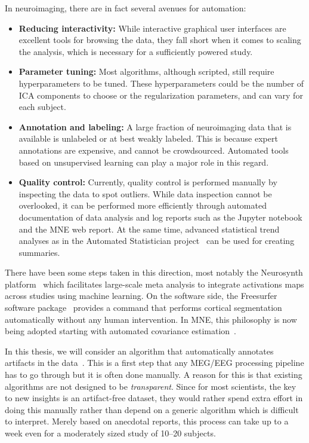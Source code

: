 In neuroimaging, there are in fact several avenues for automation:
\begin{itemize}[noitemsep,nolistsep,nosep]
\item \textbf{Reducing interactivity:} While interactive graphical user interfaces are excellent tools for browsing the data, they fall short when it comes to scaling the analysis, which is necessary for a sufficiently powered study. 

\item \textbf{Parameter tuning:} Most algorithms, although scripted, still require hyperparameters to be tuned. These hyperparameters could be the number of ICA components to choose or the regularization parameters, and can vary for each subject.
\item \textbf{Annotation and labeling:} A large fraction of neuroimaging data that is available is unlabeled or at best weakly labeled. This is because expert annotations are expensive, and cannot be crowdsourced. Automated tools based on unsupervised learning can play a major role in this regard.
\item \textbf{Quality control:} Currently, quality control is performed manually by inspecting the data to spot outliers. While data inspection cannot be overlooked, it can be performed more efficiently through automated documentation of data analysis and log reports such as the Jupyter notebook and the MNE web report. At the same time, advanced statistical trend analyses as in the Automated Statistician project~\citep{duvenaud2013structure} can be used for creating summaries.
\end{itemize}

There have been some steps taken in this direction, most notably the Neurosynth platform~\citep{yarkoni2011large} which facilitates large-scale meta analysis to integrate activations maps across studies using machine learning. On the software side, the Freesurfer software package~\citep{dale-fischl-etal:99, fischl-serena-etal:99} provides a  command that performs cortical segmentation automatically without any human intervention. In MNE, this philosophy is now being adopted starting with automated covariance estimation~\citep{engemann2015automated_new}.

In this thesis, we will consider an algorithm that automatically annotates artifacts in the data~\citep{jas2016automated, jas2017autoreject}. This is a first step that any \ac{MEG}/\ac{EEG} processing pipeline has to go through but it is often done manually. A reason for this is that existing algorithms are not designed to be \emph{transparent}. Since for most scientists, the key to new insights is an artifact-free dataset, they would rather spend extra effort in doing this manually rather than depend on a generic algorithm which is difficult to interpret. %
Merely based on anecdotal reports, this process can take up to a week even for a moderately sized study of 10--20 subjects.

